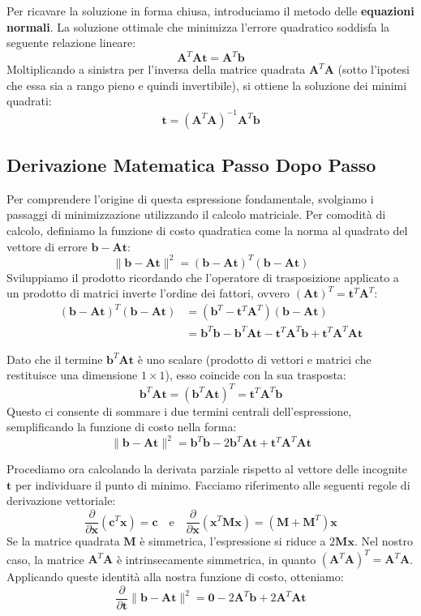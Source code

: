 ﻿\documentclass[11pt, a4paper]{article}
\begin{document}
Per ricavare la soluzione in forma chiusa, introduciamo il metodo delle \textbf{equazioni normali}. La soluzione ottimale che minimizza l'errore quadratico soddisfa la seguente relazione lineare:
\[
\bm{A}^T\bm{A}\bm{t} = \bm{A}^T\bm{b}
\]
Moltiplicando a sinistra per l'inversa della matrice quadrata $\bm{A}^T\bm{A}$ (sotto l'ipotesi che essa sia a rango pieno e quindi invertibile), si ottiene la soluzione dei minimi quadrati:
\[
\boxed{\bm{t} = (\bm{A}^T\bm{A})^{-1}\bm{A}^T\bm{b}}
\]

\subsection{Derivazione Matematica Passo Dopo Passo}

Per comprendere l'origine di questa espressione fondamentale, svolgiamo i passaggi di minimizzazione utilizzando il calcolo matriciale. Per comodità di calcolo, definiamo la funzione di costo quadratica come la norma al quadrato del vettore di errore $\bm{b} - \bm{A}\bm{t}$:
\[
\lVert\bm{b} - \bm{A}\bm{t}\rVert^2 = (\bm{b} - \bm{A}\bm{t})^T(\bm{b} - \bm{A}\bm{t})
\]
Sviluppiamo il prodotto ricordando che l'operatore di trasposizione applicato a un prodotto di matrici inverte l'ordine dei fattori, ovvero $(\bm{A}\bm{t})^T = \bm{t}^T\bm{A}^T$:
\begin{align*}
(\bm{b} - \bm{A}\bm{t})^T(\bm{b} - \bm{A}\bm{t}) &= (\bm{b}^T - \bm{t}^T\bm{A}^T)(\bm{b} - \bm{A}\bm{t}) \\
&= \bm{b}^T\bm{b} - \bm{b}^T\bm{A}\bm{t} - \bm{t}^T\bm{A}^T\bm{b} + \bm{t}^T\bm{A}^T\bm{A}\bm{t}
\end{align*}

Dato che il termine $\bm{b}^T\bm{A}\bm{t}$ è uno scalare (prodotto di vettori e matrici che restituisce una dimensione $1 \times 1$), esso coincide con la sua trasposta:
\[
\bm{b}^T\bm{A}\bm{t} = (\bm{b}^T\bm{A}\bm{t})^T = \bm{t}^T\bm{A}^T\bm{b}
\]
Questo ci consente di sommare i due termini centrali dell'espressione, semplificando la funzione di costo nella forma:
\[
\lVert\bm{b} - \bm{A}\bm{t}\rVert^2 = \bm{b}^T\bm{b} - 2\bm{b}^T\bm{A}\bm{t} + \bm{t}^T\bm{A}^T\bm{A}\bm{t}
\]

Procediamo ora calcolando la derivata parziale rispetto al vettore delle incognite $\bm{t}$ per individuare il punto di minimo. Facciamo riferimento alle seguenti regole di derivazione vettoriale:
\[
\frac{\partial}{\partial \bm{x}} \left(\bm{c}^T\bm{x}\right) = \bm{c} \quad \text{e} \quad \frac{\partial}{\partial \bm{x}} \left(\bm{x}^T\bm{M}\bm{x}\right) = \left(\bm{M} + \bm{M}^T\right)\bm{x}
\]
Se la matrice quadrata $\bm{M}$ è simmetrica, l'espressione si riduce a $2\bm{M}\bm{x}$. Nel nostro caso, la matrice $\bm{A}^T\bm{A}$ è intrinsecamente simmetrica, in quanto $(\bm{A}^T\bm{A})^T = \bm{A}^T\bm{A}$. Applicando queste identità alla nostra funzione di costo, otteniamo:
\[
\frac{\partial}{\partial \bm{t}} \lVert\bm{b} - \bm{A}\bm{t}\rVert^2 = \bm{0} - 2\bm{A}^T\bm{b} + 2\bm{A}^T\bm{A}\bm{t}
\]
\end{document}
